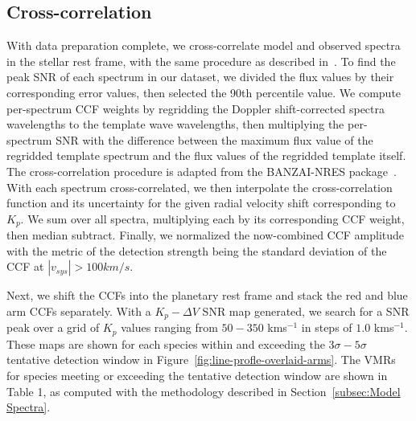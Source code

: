 \documentclass[twocolumn]{aastex631}
\begin{document}
        \subsection{Cross-correlation}
            With data preparation complete, we cross-correlate model and observed spectra in the stellar rest frame, with the same procedure as described in~\citet{Johnson2023}. To find the peak SNR of each spectrum in our dataset, we divided the flux values by their corresponding error values, then selected the 90th percentile value. We compute per-spectrum CCF weights by regridding the Doppler shift-corrected spectra wavelengths to the template wave wavelengths, then multiplying the per-spectrum SNR with the difference between the maximum flux value of the regridded template spectrum and the flux values of the regridded template itself. The cross-correlation procedure is adapted from the BANZAI-NRES package~\citep{McCully2022}. With each spectrum cross-correlated, we then interpolate the cross-correlation function and its uncertainty for the given radial velocity shift corresponding to $K_p$. We sum over all spectra, multiplying each by its corresponding CCF weight, then median subtract. Finally, we normalized the now-combined CCF amplitude with the metric of the detection strength being the standard deviation of the CCF at $|v_{sys}| > 100 km/s$.
            
            Next, we shift the CCFs into the planetary rest frame and stack the red and blue arm CCFs separately. With a ${K_p-\Delta\!V}$ SNR map generated, we search for a SNR peak over a grid of $K_p$ values ranging from $50-350$ kms$^{-1}$ in steps of $1.0$ kms$^{-1}$. These maps are shown for each species within and exceeding the ${3\sigma}-{5\sigma}$ tentative detection window in Figure~\ref{fig:line-profle-overlaid-arms}. The VMRs for species meeting or exceeding the tentative detection window are shown in Table 1, as computed with the methodology described in Section~\ref{subsec:Model Spectra}.
            
\end{document}
